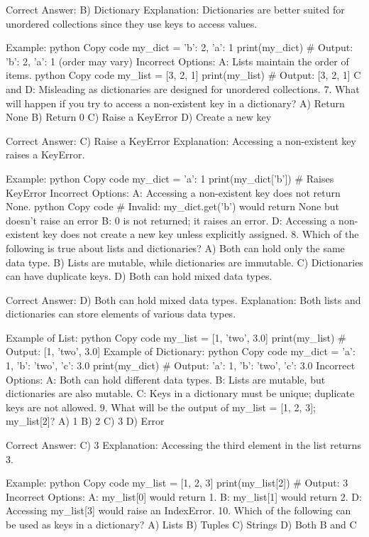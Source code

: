 Correct Answer: B) Dictionary
Explanation: Dictionaries are better suited for unordered collections since they use keys to access values.

Example:
python
Copy code
my_dict = {'b': 2, 'a': 1}
print(my_dict)  # Output: {'b': 2, 'a': 1} (order may vary)
Incorrect Options:
A: Lists maintain the order of items.
python
Copy code
my_list = [3, 2, 1]
print(my_list)  # Output: [3, 2, 1]
C and D: Misleading as dictionaries are designed for unordered collections.
7. What will happen if you try to access a non-existent key in a dictionary?
A) Return None
B) Return 0
C) Raise a KeyError
D) Create a new key

Correct Answer: C) Raise a KeyError
Explanation: Accessing a non-existent key raises a KeyError.

Example:
python
Copy code
my_dict = {'a': 1}
print(my_dict['b'])  # Raises KeyError
Incorrect Options:
A: Accessing a non-existent key does not return None.
python
Copy code
# Invalid: my_dict.get('b') would return None but doesn't raise an error
B: 0 is not returned; it raises an error.
D: Accessing a non-existent key does not create a new key unless explicitly assigned.
8. Which of the following is true about lists and dictionaries?
A) Both can hold only the same data type.
B) Lists are mutable, while dictionaries are immutable.
C) Dictionaries can have duplicate keys.
D) Both can hold mixed data types.

Correct Answer: D) Both can hold mixed data types.
Explanation: Both lists and dictionaries can store elements of various data types.

Example of List:
python
Copy code
my_list = [1, 'two', 3.0]
print(my_list)  # Output: [1, 'two', 3.0]
Example of Dictionary:
python
Copy code
my_dict = {'a': 1, 'b': 'two', 'c': 3.0}
print(my_dict)  # Output: {'a': 1, 'b': 'two', 'c': 3.0}
Incorrect Options:
A: Both can hold different data types.
B: Lists are mutable, but dictionaries are also mutable.
C: Keys in a dictionary must be unique; duplicate keys are not allowed.
9. What will be the output of my_list = [1, 2, 3]; my_list[2]?
A) 1
B) 2
C) 3
D) Error

Correct Answer: C) 3
Explanation: Accessing the third element in the list returns 3.

Example:
python
Copy code
my_list = [1, 2, 3]
print(my_list[2])  # Output: 3
Incorrect Options:
A: my_list[0] would return 1.
B: my_list[1] would return 2.
D: Accessing my_list[3] would raise an IndexError.
10. Which of the following can be used as keys in a dictionary?
A) Lists
B) Tuples
C) Strings
D) Both B and C

